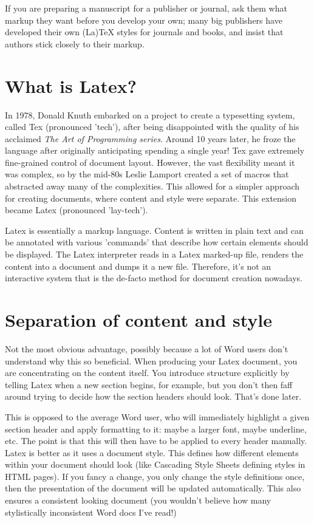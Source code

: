 If you are preparing a manuscript for a publisher or journal, ask them what markup they want before you develop your own; many big publishers have developed their own (La)TeX styles for journals and books, and insist that authors stick closely to their markup.


\section{What is Latex?}

In 1978, Donald Knuth embarked on a project to create a typesetting system, called Tex (pronounced 'tech'), after being disappointed with the quality of his acclaimed {\em The Art of Programming series}. Around 10 years later, he froze the language after originally anticipating spending a single year! Tex gave extremely fine-grained control of document layout. However, the vast flexibility meant it was complex, so by the mid-80s Leslie Lamport created a set of macros that abstracted away many of the complexities. This allowed for a simpler approach for creating documents, where content and style were separate. This extension became Latex (pronounced 'lay-tech').\citet{Bringhurst2005}

Latex is essentially a markup language. Content is written in plain text and can be annotated with various 'commands' that describe how certain elements should be displayed. The Latex interpreter reads in a Latex marked-up file, renders the content into a document and dumps it a new file. Therefore, it's not an interactive system that is the de-facto method for document creation nowadays.

\section{Separation of content and style}

Not the most obvious advantage, possibly because a lot of Word users don't understand why this so beneficial. When producing your Latex document, you are concentrating on the content itself. You introduce structure explicitly by telling Latex when a new section begins, for example, but you don't then faff around trying to decide how the section headers should look. That's done later.

This is opposed to the average Word user, who will immediately highlight a given section header and apply formatting to it: maybe a larger font, maybe underline, etc. The point is that this will then have to be applied to every header manually. Latex is better as it uses a document style. This defines how different elements within your document should look (like Cascading Style Sheets defining styles in HTML pages). If you fancy a change, you only change the style definitions once, then the presentation of the document will be updated automatically. This also ensures a consistent looking document (you wouldn't believe how many stylistically inconsistent Word docs I've read!)

